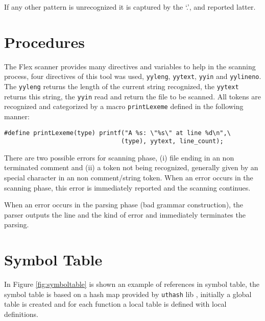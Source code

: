 \documentclass{article}
\begin{document}
If any other pattern is unrecognized it is captured by the `.', and reported
latter.

\section{Procedures}
\label{sec:proc}
The Flex scanner provides many directives and variables to help in the scanning
process, four directives of this tool was used, \texttt{yyleng},
\texttt{yytext}, \texttt{yyin} and \texttt{yylineno}. The \texttt{yyleng}
returns the length of the current string recognized, the \texttt{yytext}
returns this string, the \texttt{yyin} read and return the file to be scanned.
All tokens are recognized and categorized by a macro \texttt{printLexeme}
defined in the following manner:

\begin{verbatim}
#define printLexeme(type) printf("A %s: \"%s\" at line %d\n",\
                                (type), yytext, line_count);
\end{verbatim}

There are two possible errors for scanning phase, (i) file ending in an
non terminated comment and (ii) a token not being recognized, generally given by
an special character in an non comment/string token. When an error occurs in the
scanning phase, this error is immediately reported and the scanning continues.

When an error occurs in the parsing phase (bad grammar construction), the
parser outputs the line and the kind of error and immediately terminates the
parsing.

\section{Symbol Table}
\label{sec:symtable}
In Figure \ref{fig:symboltable} is shown an example of references in symbol
table, the symbol table is based on a hash map provided by \texttt{uthash} lib
\cite{hanson2013uthash}, initially a global table is created and for each
function a local table is defined with local definitions.
\end{document}
